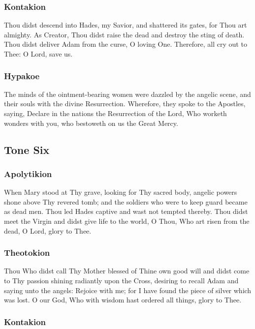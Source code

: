 \subsubsection{Kontakion}

Thou didst descend into Hades, my Savior, and shattered its gates, for Thou art almighty. As Creator, Thou didst raise the dead and destroy the sting of death. Thou didst deliver Adam from the curse, O loving One. Therefore, all cry out to Thee: O Lord, save us.

\subsubsection{Hypakoe}

The minds of the ointment-bearing women were dazzled by the angelic scene, and their souls with the divine Resurrection. Wherefore, they spoke to the Apostles, saying, Declare in the nations the Resurrection of the Lord, Who worketh wonders with you, who bestoweth on us the Great Mercy.

\subsection{Tone Six}

\subsubsection{Apolytikion}

When Mary stood at Thy grave, looking for Thy sacred body, angelic powers shone above Thy revered tomb; and the soldiers who were to keep guard became as dead men. Thou led Hades captive and wast not tempted thereby. Thou didst meet the Virgin and didst give life to the world, O Thou, Who art risen from the dead, O Lord, glory to Thee.

\subsubsection{Theotokion}

Thou Who didst call Thy Mother blessed of Thine own good will and didst come to Thy passion shining radiantly upon the Cross, desiring to recall Adam and saying unto the angels: Rejoice with me; for I have found the piece of silver which was lost. O our God, Who with wisdom hast ordered all things, glory to Thee.

\subsubsection{Kontakion}

